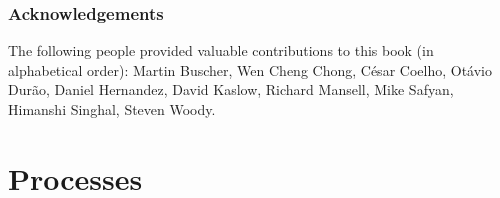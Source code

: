 \documentclass[11pt,fleqn]{book} %
\begin{document}

\section*{Acknowledgements}

The following people provided valuable contributions to this book (in alphabetical order):
Martin Buscher,
Wen Cheng Chong,
César Coelho, 
Otávio Durão, 
Daniel Hernandez,
David Kaslow,
Richard Mansell, 
Mike Safyan,
Himanshi Singhal,
Steven Woody.



\pagestyle{empty} %

\tableofcontents %

\clearpage %

\pagestyle{fancy} %


\setlength{\parskip}{0.6em}
\setlength{\parindent}{0pt}



\part{Processes}
\label{part:processes}






\end{document}
